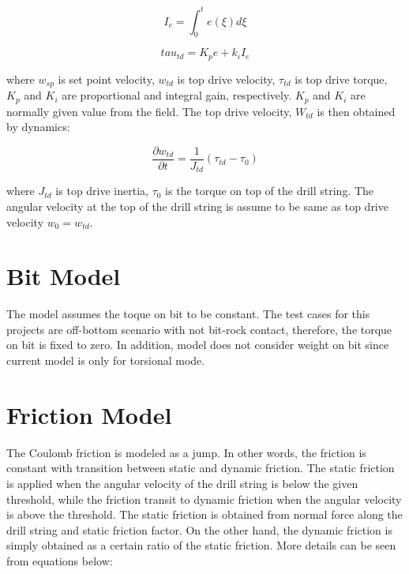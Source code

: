 \begin{equation}\label{AS_Ie}
  I_e = \int_{0}^{t}e(\xi)d\xi
\end{equation}

\begin{equation}\label{AS_tau_m}
  tau_{td} = K_pe + k_iI_e
\end{equation}

where $w_{sp}$ is set point velocity, $w_{td}$ is top drive velocity, $\tau_{td}$ is top drive torque, $K_p$ and $K_i$ are proportional and integral gain, respectively. $K_p$ and $K_i$ are normally given value from the field. The top drive velocity, $W_{td}$ is then obtained by dynamics:

\begin{equation}\label{AS_w_td}
  \frac{\partial w_{td}}{\partial t} = \frac{1}{J_{td}}(\tau_{td} - \tau_0)
\end{equation}

where $J_{td}$ is top drive inertia, $\tau_{0}$ is the torque on top of the drill string. The angular velocity at the top of the drill string is assume to be same as top drive velocity $w_0 = w_{td}$.

\section{Bit Model}
The model assumes the toque on bit to be constant. The test cases for this projects are off-bottom scenario with not bit-rock contact, therefore, the torque on bit is fixed to zero. In addition, model does not consider weight on bit since current model is only for torsional mode. 

\section{Friction Model}
The Coulomb friction is modeled as a jump. In other words, the friction is constant with transition between static and dynamic friction. The static friction is applied when the angular velocity of the drill string is below the given threshold, while the friction transit to dynamic friction when the angular velocity is above the threshold. The static friction is obtained from normal force along the drill string and static friction factor. On the other hand, the dynamic friction is simply obtained as a certain ratio of the static friction. More details can be seen from equations below:

